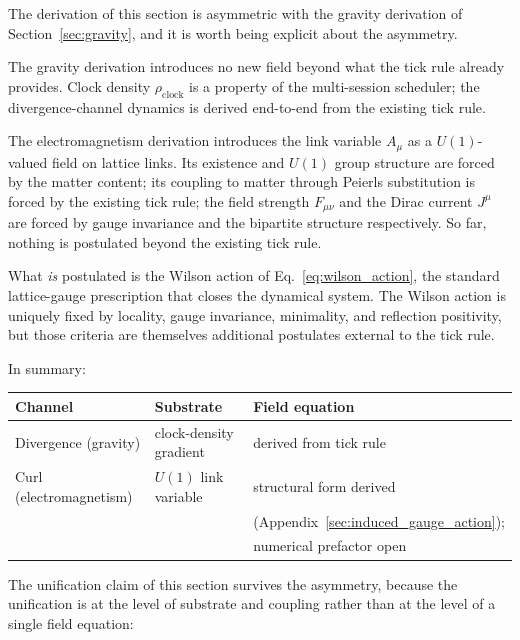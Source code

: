The derivation of this section is asymmetric with the gravity
derivation of Section~\ref{sec:gravity}, and it is worth being
explicit about the asymmetry.

The gravity derivation introduces no new field beyond what the tick
rule already provides. Clock density $\rho_\text{clock}$ is a
property of the multi-session scheduler; the divergence-channel
dynamics is derived end-to-end from the existing tick rule.

The electromagnetism derivation introduces the link variable
$A_\mu$ as a $U(1)$-valued field on lattice links. Its existence and
$U(1)$ group structure are forced by the matter content; its
coupling to matter through Peierls substitution is forced by the
existing tick rule; the field strength $F_{\mu\nu}$ and the Dirac
current $J^\mu$ are forced by gauge invariance and the bipartite
structure respectively. So far, nothing is postulated beyond the
existing tick rule.

What \emph{is} postulated is the Wilson action of
Eq.~\eqref{eq:wilson_action}, the standard lattice-gauge prescription
that closes the dynamical system. The Wilson action is uniquely fixed
by locality, gauge invariance, minimality, and reflection positivity,
but those criteria are themselves additional postulates external to
the tick rule.

In summary:

\begin{center}
\renewcommand{\arraystretch}{1.15}
\begin{tabular}{lll}
\hline
\textbf{Channel} & \textbf{Substrate} & \textbf{Field equation} \\
\hline
Divergence (gravity) & clock-density gradient & derived from tick rule \\
Curl (electromagnetism) & $U(1)$ link variable & structural form derived \\
                       &                       & (Appendix~\ref{sec:induced_gauge_action}); \\
                       &                       & numerical prefactor open \\
\hline
\end{tabular}
\end{center}

The unification claim of this section survives the asymmetry, because
the unification is at the level of substrate and coupling rather than
at the level of a single field equation:

